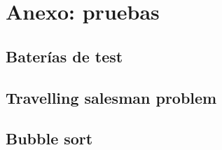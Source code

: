 \documentclass[a4paper,10pt]{article}
\begin{document}
%

%

%
\section{Anexo: pruebas}
\subsection{Baterías de test}


\subsection{Travelling salesman problem}


\subsection{Bubble sort}

\end{document}
